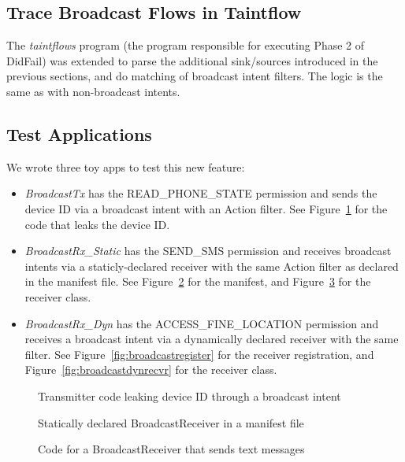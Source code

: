 \subsection{Trace Broadcast Flows in Taintflow}
The \emph{taintflows} program (the program responsible for executing Phase 2 of DidFail) was extended to parse the additional sink/sources introduced in the previous sections, and do matching of broadcast intent filters. The logic is the same as with non-broadcast intents.

\subsection{Test Applications}
We wrote three toy apps to test this new feature:

\begin{itemize}
\item{} \emph{BroadcastTx} has the READ\_PHONE\_STATE permission and sends the device ID via a broadcast intent with an Action filter. See Figure~\ref{fig:broadcastleak} for the code that leaks the device ID.

\item{} \emph{BroadcastRx\_Static} has the SEND\_SMS permission and receives broadcast intents via a staticly-declared receiver with the same Action filter as declared in the manifest file.  See Figure~\ref{fig:broadcastmanifest} for the manifest, and Figure~\ref{fig:broadcaststaticrecvr} for the receiver class.

\item{} \emph{BroadcastRx\_Dyn} has the ACCESS\_FINE\_LOCATION permission and receives a broadcast intent via a dynamically declared receiver with the same filter.  See Figure~\ref{fig:broadcastregister} for the receiver registration, and Figure~\ref{fig:broadcastdynrecvr} for the receiver class. 
\end{itemize} 

\begin{figure}[!h]

\caption{Transmitter code leaking device ID through a broadcast intent}
\label{fig:broadcastleak}
\end{figure}

\begin{figure}[!h]

\caption{Statically declared BroadcastReceiver in a manifest file}
\label{fig:broadcastmanifest}
\end{figure}

\begin{figure}[!h]

\caption{Code for a BroadcastReceiver that sends text messages}
\label{fig:broadcaststaticrecvr}
\end{figure}

